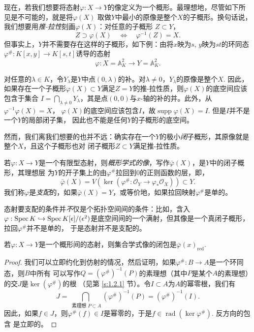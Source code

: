 现在，若我们想要将态射$\varphi:X\to Y$的像定义为一个概形。最理想地，尽管如下所见是不可能的，就是将$\varphi(X)$
取做$Y$中最小的原像是整个$X$的子概形。换句话说，我们想要用\textit{推-拉性}刻画$\varphi(X)$：对任意的子概形
$Z\subset Y$，
\[
    Z \supset \varphi(X) \quad \Longleftrightarrow \quad \varphi^{-1}(Z)=X.
\]
但事实上，$Y$并不需要存在这样的子概形，如下例：由将$x$映为$s$, $y$映为$st$的环同态
$\varphi^{\#}: K[x, y] \rightarrow K[s, t]$诱导的态射
\[
    \varphi: X=\mathbb{A}_K^2 \longrightarrow Y=\mathbb{A}_K^2.
\]



对任意的$\lambda\in K$，令$Y_\lambda$是$Y$中点$(0,\lambda)$的补。对$\lambda \neq 0$，$Y_\lambda$的原像是整个$X$.
因此，如果存在一个子概形$\varphi(X)\subset Y$满足$Z=Y$的推-拉性质，则$\varphi(X)$的底空间应该包含于集合
$I=\bigcap_{\lambda\neq 0}Y_\lambda$，其是点$(0,0)$与$x$-轴的补的并。此外，从$\varphi^{-1}\varphi(X)=X$，
$\varphi(X)$的底空间应该包含$I$，故$\operatorname{supp}\varphi(X)=I$. 但是$I$并不是一个$Y$的局部闭子集，
因此也不能是任何$Y$的子概形的底空间。

然而，我们离我们想要的也并不远：确实存在一个$Y$的极小\textit{闭}子概形，其原像就是整个$X$，且这个子概形也对
闭子概形$Z\subset Y$满足推-拉性质。

\begin{defi}\label{defi:5.2}
若$\varphi:X\to Y$是一个有限型态射，则\textit{概形学式的像}，写作$\bar\varphi(X)$，是$Y$中的闭子概形，其理想层
为$Y$的开子集上的由$\varphi^\#$拉回到$0$的正则函数的层，即，
\[
    \bar{\varphi}(X)=V\left(\ker
    \left(\varphi^{\#}: \mathscr{O}_Y \rightarrow \varphi_* \mathscr{O}_X\right)\right) \subset Y.
\]
我们称$\varphi$是\textit{支配}的，如果$\bar\varphi(X)=Y$，或等价地，如果拉回映射$\varphi^\#$是单的。
\end{defi}

态射要支配的条件并\textit{不}仅是个拓扑空间间的条件：比如，含入$\varphi:\operatorname{Spec} K\hookrightarrow 
\operatorname{Spec} K[\epsilon]/(\epsilon^2)$是底空间间的一个满射，但其像是一个真闭子概形，拉回$\varphi^\#$并不是单的，
于是态射并不是支配的。

\begin{pro}\label{pro:5.3}
若$\varphi:X\to Y$是一个概形间的态射，则集合学式像的闭包是$\bar\varphi(x)_{\text{red}}$.
\end{pro}

\begin{proof}
我们可以立即约化到仿射的情况，然后证明，如果$\varphi^\#:B\to A$是一个环同态，则$B$中所有
可以写作$Q=(\varphi^\#)^{-1}(P)$的素理想（其中$P$是某个$A$的素理想）的交$J$是$\ker(\varphi^\#)$的根
（见第 \ref{s:1.2.1} 节）。令$I\subset A$为$A$的幂零根，我们有 
\[
    J=\bigcap_{\text { 素理想 } P \subset A}\left(\varphi^{\#}\right)^{-1}(P)=\left(\varphi^{\#}\right)^{-1}(I) .
\]
因此，如果$f\in J$，则$\varphi^\#(f)\in I$是幂零的，于是$f\in \operatorname{rad}(\ker \varphi^\#)$. 反方向的包含
是立即的。
\end{proof}

